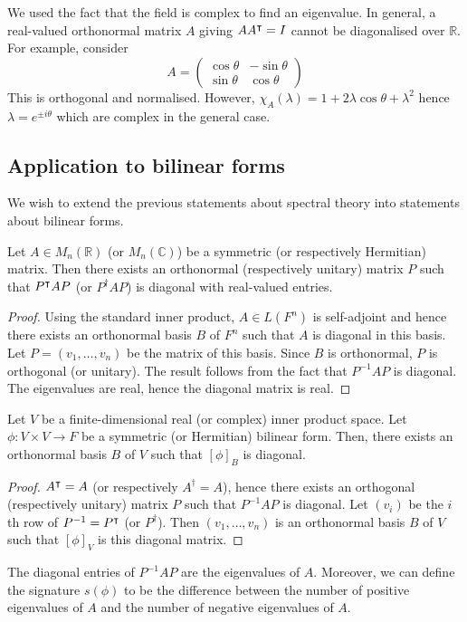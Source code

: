 \begin{remark}
	We used the fact that the field is complex to find an eigenvalue.
	In general, a real-valued orthonormal matrix \( A \) giving \( A A^\intercal = I \) cannot be diagonalised over \( \mathbb R \).
	For example, consider
	\[
		A = \begin{pmatrix}
			\cos\theta & -\sin\theta \\
			\sin\theta & \cos\theta
		\end{pmatrix}
	\]
	This is orthogonal and normalised.
	However, \( \chi_A(\lambda) = 1 + 2\lambda \cos\theta + \lambda^2 \) hence \( \lambda = e^{\pm i \theta} \) which are complex in the general case.
\end{remark}

\subsection{Application to bilinear forms}
We wish to extend the previous statements about spectral theory into statements about bilinear forms.
\begin{corollary}
	Let \( A \in M_n(\mathbb R) \) (or \( M_n(\mathbb C) \)) be a symmetric (or respectively Hermitian) matrix.
	Then there exists an orthonormal (respectively unitary) matrix \( P \) such that \( P^\intercal A P \) (or \( P^\dagger A P \)) is diagonal with real-valued entries.
\end{corollary}
\begin{proof}
	Using the standard inner product, \( A \in L(F^n) \) is self-adjoint and hence there exists an orthonormal basis \( B \) of \( F^n \) such that \( A \) is diagonal in this basis.
	Let \( P = (v_1, \dots, v_n) \) be the matrix of this basis.
	Since \( B \) is orthonormal, \( P \) is orthogonal (or unitary).
	The result follows from the fact that \( P^{-1} A P \) is diagonal.
	The eigenvalues are real, hence the diagonal matrix is real.
\end{proof}
\begin{corollary}
	Let \( V \) be a finite-dimensional real (or complex) inner product space.
	Let \( \phi \colon V \times V \to F \) be a symmetric (or Hermitian) bilinear form.
	Then, there exists an orthonormal basis \( B \) of \( V \) such that \( [\phi]_B \) is diagonal.
\end{corollary}
\begin{proof}
	\( A^\intercal = A \) (or respectively \( A^\dagger = A \)), hence there exists an orthogonal (respectively unitary) matrix \( P \) such that \( P^{-1} A P \) is diagonal.
	Let \( (v_i) \) be the \( i \)th row of \( P^{-1} = P^\intercal \) (or \( P^\dagger \)).
	Then \( (v_1, \dots, v_n) \) is an orthonormal basis \( B \) of \( V \) such that \( [\phi]_V \) is this diagonal matrix.
\end{proof}
\begin{remark}
	The diagonal entries of \( P^{-1} A P \) are the eigenvalues of \( A \).
	Moreover, we can define the signature \( s(\phi) \) to be the difference between the number of positive eigenvalues of \( A \) and the number of negative eigenvalues of \( A \).
\end{remark}

